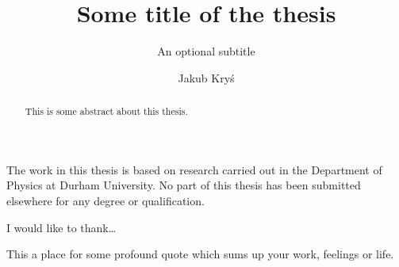 \documentclass[twoside,openright,frontopenright,halfspacing]{ip3thesis}
\begin{document}
\title{Some title of the thesis}
\subtitle{An optional subtitle}
\author{Jakub Kryś}
\maketitlepage*

\begin{abstract}
%
	This is some abstract about this thesis.
%
\end{abstract}

\disableprotrusion
\tableofcontents*
\listoffigures
\listoftables
\enableprotrusion

\begin{declaration*}
%
	The work in this thesis is based on research carried out in the Department of
	Physics at Durham University. No part of this thesis has been
	submitted elsewhere for any degree or qualification.
%
\end{declaration*}

\begin{acknowledgements*}
%
	I would like to thank\ldots
%
\end{acknowledgements*}

\begin{epigraph*}
%
	This a place for some profound quote which sums up your work, feelings or
	life.
%
\end{epigraph*}


\cleardoublepage









\appendix
%
%



\end{document}
